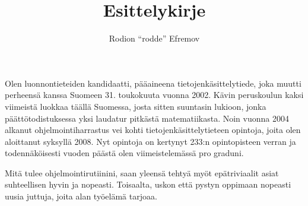 \documentclass[10pt]{article}
\title{Esittelykirje}
\author{Rodion ``rodde'' Efremov}
\begin{document}
 \maketitle

Olen luonnontieteiden kandidaatti, pääaineena tietojenkäsittelytiede, joka muutti perheensä kanssa Suomeen 31. toukokuuta vuonna 2002. Kävin peruskoulun kaksi viimeistä luokkaa täällä Suomessa, josta sitten suuntasin lukioon, jonka päättötodistuksessa yksi laudatur pitkästä matematiikasta. Noin vuonna 2004 alkanut ohjelmointiharrastus vei kohti tietojenkäsittelytieteen opintoja, joita olen aloittanut syksyllä 2008. Nyt opintoja on kertynyt 233:n opintopisteen verran ja todennäköisesti vuoden päästä olen viimeistelemässä pro graduni.

Mitä tulee ohjelmointirutiinini, saan yleensä tehtyä myöt epätriviaalit asiat suhteellisen hyvin ja nopeasti. Toisaalta, uskon että pystyn oppimaan nopeasti uusia juttuja, joita alan työelämä tarjoaa.
\end{document}
